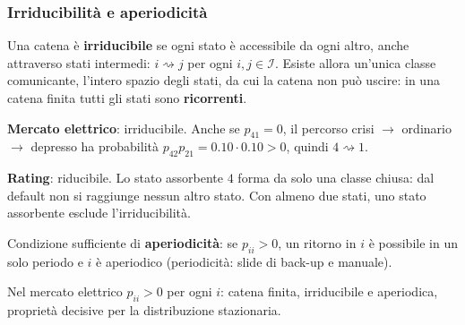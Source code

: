 %

\begin{frame}%
%

\frametitle{Irriducibilit\`{a} e aperiodicit\`{a}}%
%

%


Una catena \`{e} \textbf{irriducibile} se ogni stato \`{e} accessibile da ogni
altro, anche attraverso stati intermedi: $i\rightsquigarrow j$ per ogni
$i,j\in\mathcal{I}$. Esiste allora un'unica classe comunicante, l'intero
spazio degli stati, da cui la catena non pu\`{o} uscire: in una catena finita
tutti gli stati sono \textbf{ricorrenti}.

\medskip

\begin{stepitemize}
\item \textbf{Mercato elettrico}: irriducibile. Anche se $p_{41}=0$, il
percorso crisi $\rightarrow$ ordinario $\rightarrow$ depresso ha
probabilit\`{a} $p_{42}p_{21}=0.10\cdot0.10>0$, quindi $4\rightsquigarrow1$.

\item \textbf{Rating}: riducibile. Lo stato assorbente $4$ forma da solo una
classe chiusa: dal default non si raggiunge nessun altro stato. Con almeno due
stati, uno stato assorbente esclude l'irriducibilit\`{a}.
\end{stepitemize}

\medskip

Condizione sufficiente di \textbf{aperiodicit\`{a}}: se $p_{ii}>0$, un ritorno
in $i$ \`{e} possibile in un solo periodo e $i$ \`{e} aperiodico
(periodicit\`{a}: slide di back-up e manuale).

\medskip

\begin{center}
{\small Nel mercato elettrico $p_{ii}>0$ per ogni $i$: catena finita,
irriducibile e aperiodica, propriet\`{a} decisive per la distribuzione
stazionaria.}
\end{center}%

\transboxout
\end{frame}%


